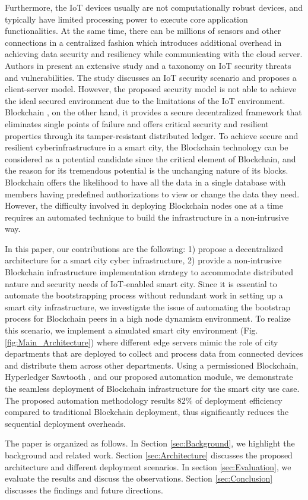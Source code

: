 Furthermore, the IoT devices usually are not computationally robust devices, and typically have limited processing power to execute core application functionalities. At the same time, there can be millions of sensors and other connections in a centralized fashion which introduces additional overhead in achieving data security and resiliency while communicating with the cloud server. Authors in  \cite{alaba_internet_2017} present an extensive study and a taxonomy on IoT security threats and vulnerabilities. The study discusses an IoT security scenario and proposes a client-server model. However, the proposed security model is not able to achieve the ideal secured environment due to the limitations of the IoT environment. Blockchain \cite{toshsecurity2017}, on the other hand, it provides a secure decentralized framework that eliminates single points of failure and offers critical security and resilient properties through its tamper-resistant distributed ledger. To achieve secure and resilient cyberinfrastructure in a smart city, the Blockchain technology can be considered as a potential candidate since the critical element of Blockchain, and the reason for its tremendous potential is the unchanging nature of its blocks. Blockchain offers the likelihood to have all the data in a single database with members having predefined authorizations to view or change the data they need. However, the difficulty involved in deploying Blockchain nodes one at a time requires an automated technique to build the infrastructure in a non-intrusive way.

In this paper, our contributions are the following: 1) propose a decentralized architecture for a smart city cyber infrastructure, 2) provide a non-intrusive Blockchain infrastructure implementation strategy to accommodate distributed nature and security needs of IoT-enabled smart city. Since it is essential to automate the bootstrapping process without redundant work in setting up a smart city infrastructure, we investigate the issue of automating the bootstrap process for Blockchain peers in a high node dynamism environment. To realize this scenario, we implement a simulated smart city environment (Fig. \ref{fig:Main_Architecture}) where different edge servers mimic the role of city departments that are deployed to collect and process data from connected devices and distribute them across other departments. Using a permissioned Blockchain, Hyperledger Sawtooth \cite{hyperledger-sawtooth}, and our proposed automation module, we demonstrate the seamless deployment of Blockchain infrastructure for the smart city use case. The proposed automation methodology results 82\% of deployment efficiency compared to traditional Blockchain deployment, thus significantly reduces the sequential deployment overheads.

The paper is organized as follows. In Section \ref{sec:Background}, we highlight the background and related work. Section \ref{sec:Architecture} discusses the proposed architecture and different deployment scenarios. In section \ref{sec:Evaluation}, we evaluate the results and discuss the observations. Section \ref{sec:Conclusion} discusses the findings and future directions. 



